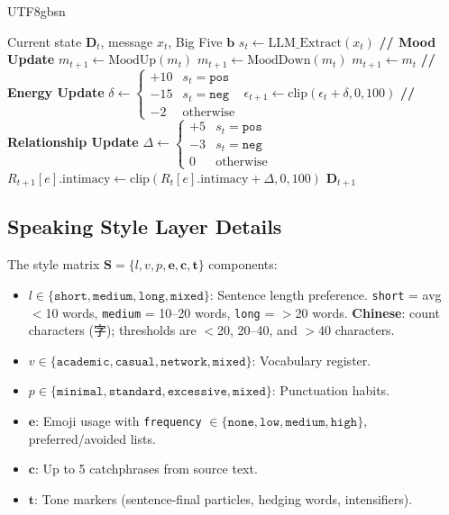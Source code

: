 \documentclass[11pt]{article}
\begin{document}
\begin{CJK*}{UTF8}{gbsn}
\begin{algorithm}[t]
\caption{Dynamic State Update}
\label{alg:update}
\begin{algorithmic}[1]
\REQUIRE Current state $\mathbf{D}_t$, message $x_t$, Big Five $\mathbf{b}$
\STATE $s_t \leftarrow \text{LLM\_Extract}(x_t)$ 
\STATE \textbf{// Mood Update}
    \STATE $m_{t+1} \leftarrow \text{MoodUp}(m_t)$
    \STATE $m_{t+1} \leftarrow \text{MoodDown}(m_t)$
\ELSE
    \STATE $m_{t+1} \leftarrow m_t$
\ENDIF
\STATE \textbf{// Energy Update}
\STATE $\delta \leftarrow \begin{cases} +10 & s_t = \texttt{pos} \\ -15 & s_t = \texttt{neg} \\ -2 & \text{otherwise} \end{cases}$
\STATE $\epsilon_{t+1} \leftarrow \text{clip}(\epsilon_t + \delta, 0, 100)$
\STATE \textbf{// Relationship Update}
    \STATE $\Delta \leftarrow \begin{cases} +5 & s_t = \texttt{pos} \\ -3 & s_t = \texttt{neg} \\ 0 & \text{otherwise} \end{cases}$
    \STATE $R_{t+1}[e].\text{intimacy} \leftarrow \text{clip}(R_t[e].\text{intimacy} + \Delta, 0, 100)$
\ENDIF
\RETURN $\mathbf{D}_{t+1}$
\end{algorithmic}
\end{algorithm}

\subsection{Speaking Style Layer Details}
\label{sec:style_details}

The style matrix $\mathbf{S} = \{l, v, p, \mathbf{e}, \mathbf{c}, \mathbf{t}\}$ components:

\begin{itemize}
    \item $l \in \{\texttt{short}, \texttt{medium}, \texttt{long}, \texttt{mixed}\}$: Sentence length preference. \texttt{short} = avg $<$10 words, \texttt{medium} = 10--20 words, \texttt{long} = $>$20 words. \textbf{Chinese}: count characters (字); thresholds are $<$20, 20--40, and $>$40 characters.
    \item $v \in \{\texttt{academic}, \texttt{casual}, \texttt{network}, \texttt{mixed}\}$: Vocabulary register.
    \item $p \in \{\texttt{minimal}, \texttt{standard}, \texttt{excessive}, \texttt{mixed}\}$: Punctuation habits.
    \item $\mathbf{e}$: Emoji usage with \texttt{frequency} $\in \{\texttt{none}, \texttt{low}, \texttt{medium}, \texttt{high}\}$, preferred/avoided lists.
    \item $\mathbf{c}$: Up to 5 catchphrases from source text.
    \item $\mathbf{t}$: Tone markers (sentence-final particles, hedging words, intensifiers).
\end{itemize}


\end{CJK*}
\end{document}
